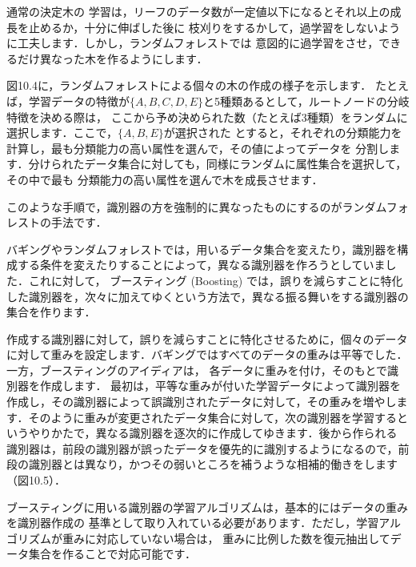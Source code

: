 
通常の決定木の
学習は，リーフのデータ数が一定値以下になるとそれ以上の成長を止めるか，十分に伸ばした後に
枝刈りをするかして，過学習をしないように工夫します．しかし，ランダムフォレストでは
意図的に過学習をさせ，できるだけ異なった木を作るようにします．


図10.4に，ランダムフォレストによる個々の木の作成の様子を示します．
たとえば，学習データの特徴が$\{A,B,C,D,E\}$と5種類あるとして，ルートノードの分岐特徴を決める際は，
ここから予め決められた数（たとえば3種類）をランダムに選択します．ここで，$\{A,B,E\}$が選択された
とすると，それぞれの分類能力を計算し，最も分類能力の高い属性を選んで，その値によってデータを
分割します．分けられたデータ集合に対しても，同様にランダムに属性集合を選択して，その中で最も
分類能力の高い属性を選んで木を成長させます．


このような手順で，識別器の方を強制的に異なったものにするのがランダムフォレストの手法です．


バギングやランダムフォレストでは，用いるデータ集合を変えたり，識別器を構成する条件を変えたりすることによって，異なる識別器を作ろうとしていました．これに対して，
ブースティング (Boosting) 
では，誤りを減らすことに特化した識別器を，次々に加えてゆくという方法で，異なる振る舞いをする識別器の集合を作ります．


作成する識別器に対して，誤りを減らすことに特化させるために，個々のデータに対して重みを設定します．バギングではすべてのデータの重みは平等でした．
一方，ブースティングのアイディアは，
各データに重みを付け，そのもとで識別器を作成します．
最初は，平等な重みが付いた学習データによって識別器を作成し，その識別器によって誤識別されたデータに対して，その重みを増やします．そのように重みが変更されたデータ集合に対して，次の識別器を学習するというやりかたで，異なる識別器を逐次的に作成してゆきます．後から作られる
識別器は，前段の識別器が誤ったデータを優先的に識別するようになるので，前段の識別器とは異なり，かつその弱いところを補うような相補的働きをします（図10.5）．



ブースティングに用いる識別器の学習アルゴリズムは，基本的にはデータの重みを識別器作成の
基準として取り入れている必要があります．ただし，学習アルゴリズムが重みに対応していない場合は，
重みに比例した数を復元抽出してデータ集合を作ることで対応可能です．

